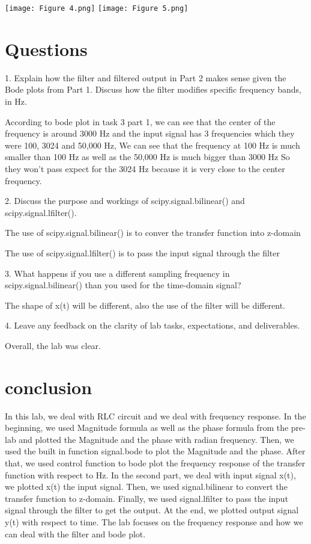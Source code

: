 \documentclass[12pt]{report}
\begin{document}
\texttt{[image: Figure 4.png]} 
\texttt{[image: Figure 5.png]} 


\section{Questions}

1. Explain how the filter and filtered output in Part 2 makes sense given the Bode plots from
Part 1. Discuss how the filter modifies specific frequency bands, in Hz.

According to bode plot in task 3 part 1, we can see that the center of the frequency is around 3000 Hz and the input signal has 3 frequencies which they were 100, 3024 and 50,000 Hz, We can see that the frequency at 100 Hz is much smaller than 100 Hz as well as the 50,000 Hz is much bigger than 3000 Hz  So they won't pass expect for the 3024 Hz because it is very close to the center frequency.

2. Discuss the purpose and workings of
scipy.signal.bilinear() and scipy.signal.lfilter().

The use of scipy.signal.bilinear() is to conver the transfer function into z-domain

The use of scipy.signal.lfilter() is to pass the input signal through the filter

3. What happens if you use a different sampling frequency in scipy.signal.bilinear() than
you used for the time-domain signal?

The shape of x(t) will be different, also the use of the filter will be different.

4. Leave any feedback on the clarity of lab tasks, expectations, and deliverables.

Overall, the lab was clear.






\section{conclusion}

In this lab, we deal with RLC circuit and we deal with frequency response. In the beginning, we used Magnitude formula as well as the phase formula from the pre- lab and plotted the Magnitude and the phase with radian frequency. Then, we used the built in function signal.bode to plot the Magnitude and the phase. After that, we used control function to bode plot the frequency response of the transfer function with respect to Hz. In the second part, we deal with input signal x(t), we plotted x(t) the input signal. Then, we used signal.bilinear to convert the transfer function to z-domain. Finally, we used signal.lfilter to pass the input signal through the filter to get the output. At the end, we plotted output signal y(t) with respect to time. The lab focuses on the frequency response and how we can deal with the filter and bode plot.




\newpage
\end{document}
